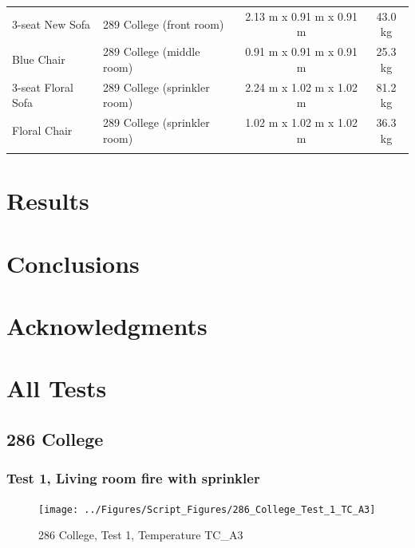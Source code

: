 \documentclass[12pt,oneside]{book}
\begin{document}
\begin{table}
\begin{tabular}{llcc}
3-seat New Sofa              &  289 College (front room)         &  2.13 m x 0.91 m x 0.91 m  &  43.0 kg    \\
Blue Chair                   &  289 College (middle room)        &  0.91 m x 0.91 m x 0.91 m  &  25.3 kg    \\
3-seat Floral Sofa           &  289 College (sprinkler room)     &  2.24 m x 1.02 m x 1.02 m  &  81.2 kg    \\
Floral Chair                 &  289 College (sprinkler room)     &  1.02 m x 1.02 m x 1.02 m  &  36.3 kg    \\
\noalign{\smallskip}\hline
\end{tabular}
\label{tab:Fuel_Masses}
\end{table}

\chapter{Results}
\label{chap:Results}


\clearpage


\chapter{Conclusions}
\label{chap:Conclusions}

\chapter{Acknowledgments}
\label{chap:Acknowledgments}



\appendix

\chapter{All Tests}

\section{286 College}

\subsection{Test 1, Living room fire with sprinkler}

\begin{figure}[!ht]
\texttt{[image: ../Figures/Script\_Figures/286\_College\_Test\_1\_TC\_A3]}
\caption{286 College, Test 1, Temperature TC\_A3}
\label{fig:286_College_Test_1_TC_A3}
\end{figure}
\end{document}
